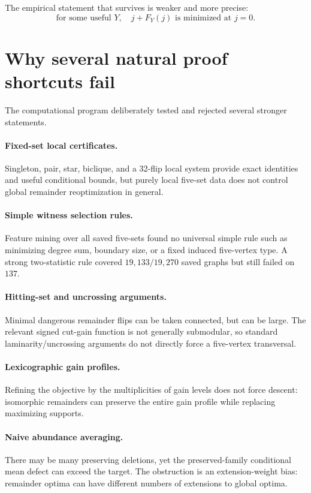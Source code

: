 \documentclass[11pt]{article}
\begin{document}
The empirical statement that survives is weaker and more precise:
\[
\boxed{
\text{for some useful }Y,\quad j+F_Y(j)\text{ is minimized at }j=0.
}
\]

\section{Why several natural proof shortcuts fail}

The computational program deliberately tested and rejected several
stronger statements.

\paragraph{Fixed-set local certificates.}
Singleton, pair, star, biclique, and a 32-flip local system provide exact
identities and useful conditional bounds, but purely local five-set data
does not control global remainder reoptimization in general.

\paragraph{Simple witness selection rules.}
Feature mining over all saved five-sets found no universal simple rule such
as minimizing degree sum, boundary size, or a fixed induced five-vertex
type.  A strong two-statistic rule covered $19{,}133/19{,}270$ saved graphs
but still failed on $137$.

\paragraph{Hitting-set and uncrossing arguments.}
Minimal dangerous remainder flips can be taken connected, but can be large.
The relevant signed cut-gain function is not generally submodular, so
standard laminarity/uncrossing arguments do not directly force a
five-vertex transversal.

\paragraph{Lexicographic gain profiles.}
Refining the objective by the multiplicities of gain levels does not force
descent: isomorphic remainders can preserve the entire gain profile while
replacing maximizing supports.

\paragraph{Naive abundance averaging.}
There may be many preserving deletions, yet the preserved-family conditional
mean defect can exceed the target.  The obstruction is an extension-weight
bias: remainder optima can have different numbers of extensions to global
optima.
\end{document}

